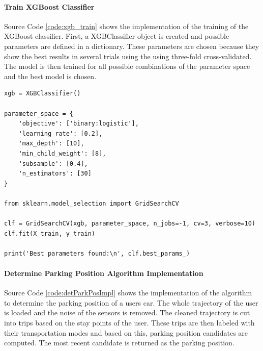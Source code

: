 \paragraph{Train XGBoost Classifier} Source Code \ref{code:xgb_train} shows the implementation of the training of the XGBoost classifier. First, a XGBClassifier object is created and possible parameters are defined in a dictionary. These parameters are chosen because they show the best results in several trials using the using three-fold cross-validated. The model is then trained for all possible combinations of the parameter space and the best model is chosen. 

\begin{lstlisting}[style=py, caption={Train XGBoost Classifier}, label={code:xgb_train}]
xgb = XGBClassifier()

parameter_space = {
    'objective': ['binary:logistic'],
    'learning_rate': [0.2],
    'max_depth': [10],
    'min_child_weight': [8],
    'subsample': [0.4],
    'n_estimators': [30]
}

from sklearn.model_selection import GridSearchCV

clf = GridSearchCV(xgb, parameter_space, n_jobs=-1, cv=3, verbose=10)
clf.fit(X_train, y_train)

print('Best parameters found:\n', clf.best_params_)
\end{lstlisting}{}


\paragraph{Determine Parking Position Algorithm Implementation} Source Code \ref{code:detParkPosImpl} shows the implementation of the algorithm to determine the parking position of a users car. The whole trajectory of the user is loaded and the noise of the sensors is removed. The cleaned trajectory is cut into trips based on the stay points of the user. These trips are then labeled with their transportation modes and based on this, parking position candidates are computed. The most recent candidate is returned as the parking position.

